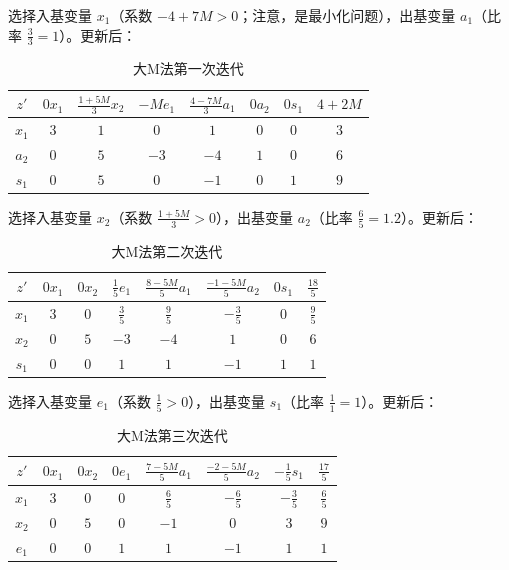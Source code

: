 \documentclass[12pt]{article}
\theoremstyle{plain}
\theoremstyle{definition}
\begin{document}
选择入基变量 $x_1$（系数 $-4 + 7M > 0$；注意，是最小化问题），出基变量 $a_1$（比率 $\frac{3}{3} = 1$）。更新后：
\begin{table}[!htbp]
    \centering
    \caption{大M法第一次迭代}
    \begin{tabular}{c|cccccc|c}
        \hline
        $z'$ & $0x_1$ & $\frac{1+5M}{3}x_2$ & $-Me_1$ & $\frac{4-7M}{3}a_1$ & $0a_2$ & $0s_1$ & $4+2M$ \\ 
        \hline
        $x_1$ & $3$ & $1$ & $0$ & $1$ & $0$ & $0$ & $3$ \\
        $a_2$ & $0$ & $5$ & $-3$ & $-4$ & $1$ & $0$ & $6$ \\
        $s_1$ & $0$ & $5$ & $0$ & $-1$ & $0$ & $1$ & $9$ \\
        \hline
    \end{tabular}
\end{table}

选择入基变量 $x_2$（系数 $\frac{1+5M}{3} > 0$），出基变量 $a_2$（比率 $\frac{6}{5} = 1.2$）。更新后：    
\begin{table}[!htbp]
    \centering
    \caption{大M法第二次迭代}
    \begin{tabular}{c|cccccc|c}
        \hline
        $z'$ & $0x_1$ & $0x_2$ & $\frac{1}{5}e_1$ & $\frac{8-5M}{5}a_1$ & $\frac{-1-5M}{5}a_2$ & $0s_1$ & $\frac{18}{5}$ \\
        \hline
        $x_1$ & $3$ & $0$ & $\frac{3}{5}$ & $\frac{9}{5}$ & $-\frac{3}{5}$ & $0$ & $\frac{9}{5}$ \\
        $x_2$ & $0$ & $5$ & $-3$ & $-4$ & $1$ & $0$ & $6$ \\
        $s_1$ & $0$ & $0$ & $1$ & $1$ & $-1$ & $1$ & $1$ \\
        \hline
    \end{tabular}
\end{table}

选择入基变量 $e_1$（系数 $\frac{1}{5} > 0$），出基变量 $s_1$（比率 $\frac{1}{1} = 1$）。更新后：
\begin{table}[!htbp]
    \centering
    \caption{大M法第三次迭代}
    \begin{tabular}{c|cccccc|c}
        \hline
        $z'$ & $0x_1$ & $0x_2$ & $0e_1$ & $\frac{7-5M}{5}a_1$ & $\frac{-2-5M}{5}a_2$ & $-\frac{1}{5}s_1$ & $\frac{17}{5}$ \\
        \hline
        $x_1$ & $3$ & $0$ & $0$ & $\frac{6}{5}$ & $-\frac{6}{5}$ & $-\frac{3}{5}$ & $\frac{6}{5}$ \\
        $x_2$ & $0$ & $5$ & $0$ & $-1$ & $0$ & $3$ & $9$ \\
        $e_1$ & $0$ & $0$ & $1$ & $1$ & $-1$ & $1$ & $1$ \\
        \hline
    \end{tabular}
\end{table}
\end{document}
